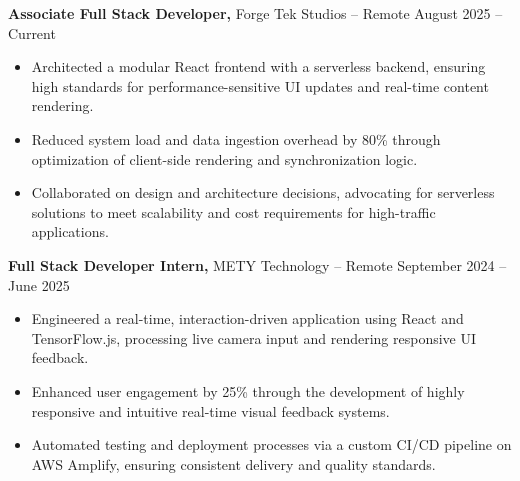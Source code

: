 \documentclass[11pt]{article}       %
\begin{document}
\textbf{Associate Full Stack Developer,} {Forge Tek Studios} -- Remote \hfill August 2025 -- Current 
\vspace{-9pt}
\begin{itemize}
  \item Architected a modular React frontend with a serverless backend, ensuring high standards for performance-sensitive UI updates and real-time content rendering.
  \item Reduced system load and data ingestion overhead by 80\% through optimization of client-side rendering and synchronization logic.
  \item Collaborated on design and architecture decisions, advocating for serverless solutions to meet scalability and cost requirements for high-traffic applications.
\end{itemize}

\textbf{Full Stack Developer Intern,} {METY Technology} -- Remote \hfill September 2024 -- June 2025 
\vspace{-9pt}
\begin{itemize}
  \item Engineered a real-time, interaction-driven application using React and TensorFlow.js, processing live camera input and rendering responsive UI feedback.
  \item Enhanced user engagement by 25\% through the development of highly responsive and intuitive real-time visual feedback systems.
  \item Automated testing and deployment processes via a custom CI/CD pipeline on AWS Amplify, ensuring consistent delivery and quality standards.
\end{itemize}

\end{document}
